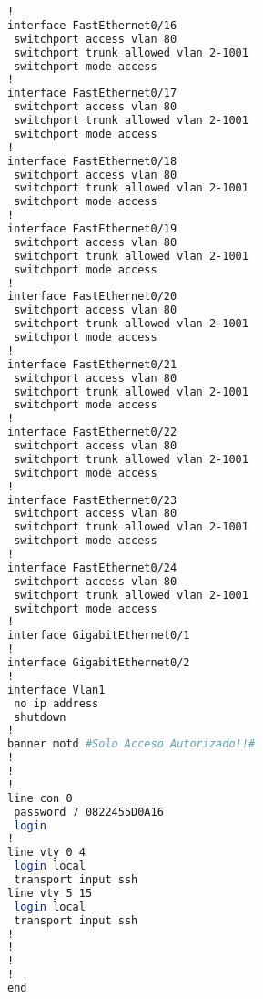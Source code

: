 \begin{lstlisting}[language=Bash, caption={Configuración Completa Switch Inmunologia}]
!
interface FastEthernet0/16
 switchport access vlan 80
 switchport trunk allowed vlan 2-1001
 switchport mode access
!
interface FastEthernet0/17
 switchport access vlan 80
 switchport trunk allowed vlan 2-1001
 switchport mode access
!
interface FastEthernet0/18
 switchport access vlan 80
 switchport trunk allowed vlan 2-1001
 switchport mode access
!
interface FastEthernet0/19
 switchport access vlan 80
 switchport trunk allowed vlan 2-1001
 switchport mode access
!
interface FastEthernet0/20
 switchport access vlan 80
 switchport trunk allowed vlan 2-1001
 switchport mode access
!
interface FastEthernet0/21
 switchport access vlan 80
 switchport trunk allowed vlan 2-1001
 switchport mode access
!
interface FastEthernet0/22
 switchport access vlan 80
 switchport trunk allowed vlan 2-1001
 switchport mode access
!
interface FastEthernet0/23
 switchport access vlan 80
 switchport trunk allowed vlan 2-1001
 switchport mode access
!
interface FastEthernet0/24
 switchport access vlan 80
 switchport trunk allowed vlan 2-1001
 switchport mode access
!
interface GigabitEthernet0/1
!
interface GigabitEthernet0/2
!
interface Vlan1
 no ip address
 shutdown
!
banner motd #Solo Acceso Autorizado!!#
!
!
!
line con 0
 password 7 0822455D0A16
 login
!
line vty 0 4
 login local
 transport input ssh
line vty 5 15
 login local
 transport input ssh
!
!
!
!
end
\end{lstlisting}
